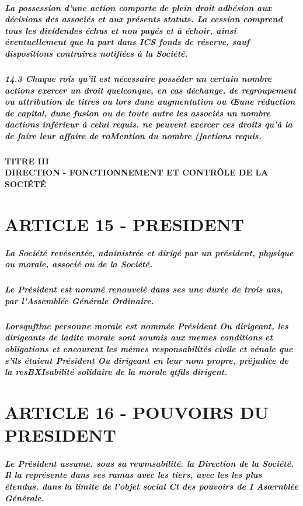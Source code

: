 \documentclass[a4paper, 11pt]{article}
\begin{document}
\subparagraph{
  La possession d'une action comporte de plein droit adhésion aux décisions des associés et aux présents statuts. La cession comprend tous les dividendes échus et non payés et à échoir, ainsi éventuellement que la part dans ICS fonds dc réserve, sauf dispositions contraires notifiées à la Société.
}

\subparagraph{
  14.3 Chaque rois qu'il est nécessaire posséder un certain nombre actions exercer un droit quelconque, en cas déchange, de regroupement ou attribution de titres ou lors dune augmentation ou Œune réduction de capital, dune fusion ou de toute autre les associés un nombre dactions inférieur à celui requis. ne peuvent exercer ces droits qu'à la de faire leur affaire de roMention du nombre (factions requis.
}

\paragraph{
  TITRE III\\
  DIRECTION - FONCTIONNEMENT ET CONTRÔLE DE LA SOCIÉTÉ
}

\section*{ARTICLE 15 - PRESIDENT}

\subparagraph{
  La Société revésentée, adninistrée et dirigé par un président, physique ou morale, associé ou de la Société.
}

\subparagraph{
  Le Président est nommé renouvelé dans ses une durée de trois ans, par l'Assemblée Générale Ordinaire.
}

\subparagraph{
  Lorsquftlnc personne morale est nommée Président Ou dirigeant, les dirigeants de ladite morale sont soumis aux memes conditions et obligations et encourent les mêmes responsabilités civile ct vénale que s'ils étaient Président Ou dirigeant en leur nom propre, préjudice de la resBXIsabilité solidaire de la morale qtfils dirigent.
}

\section*{ARTICLE 16 - POUVOIRS DU PRESIDENT}

\subparagraph{
  Le Président assume. sous sa rewmsabilité. la Direction de la Société. Il la représente dans ses ramas avec les tiers, avec les les plus étendus. dans la limite de l'objet social Ct des pouvoirs de I  Asœrnblée Générale.
}
\end{document}
